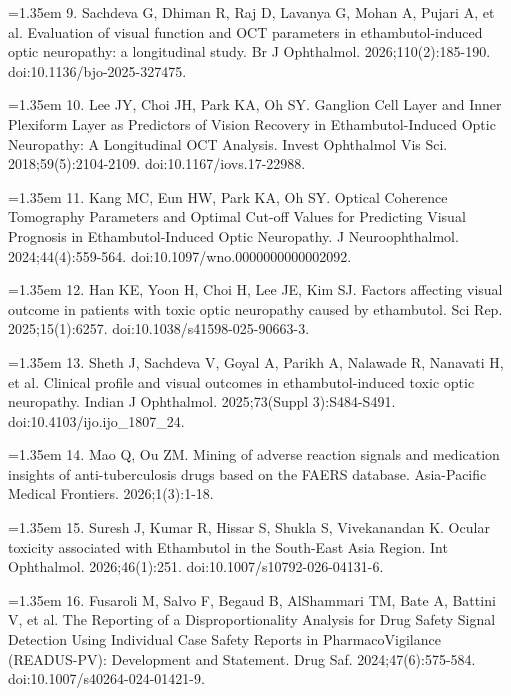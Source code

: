\documentclass[12pt,a4paper]{article}
\begin{document}
\par\noindent\hangindent=1.35em 9. Sachdeva G, Dhiman R, Raj D, Lavanya G, Mohan A, Pujari A, et al. Evaluation of visual function and OCT parameters in ethambutol-induced optic neuropathy: a longitudinal study. Br J Ophthalmol. 2026;110(2):185-190. doi:10.1136/bjo-2025-327475.\par
\par\noindent\hangindent=1.35em 10. Lee JY, Choi JH, Park KA, Oh SY. Ganglion Cell Layer and Inner Plexiform Layer as Predictors of Vision Recovery in Ethambutol-Induced Optic Neuropathy: A Longitudinal OCT Analysis. Invest Ophthalmol Vis Sci. 2018;59(5):2104-2109. doi:10.1167/iovs.17-22988.\par
\par\noindent\hangindent=1.35em 11. Kang MC, Eun HW, Park KA, Oh SY. Optical Coherence Tomography Parameters and Optimal Cut-off Values for Predicting Visual Prognosis in Ethambutol-Induced Optic Neuropathy. J Neuroophthalmol. 2024;44(4):559-564. doi:10.1097/wno.0000000000002092.\par
\par\noindent\hangindent=1.35em 12. Han KE, Yoon H, Choi H, Lee JE, Kim SJ. Factors affecting visual outcome in patients with toxic optic neuropathy caused by ethambutol. Sci Rep. 2025;15(1):6257. doi:10.1038/s41598-025-90663-3.\par
\par\noindent\hangindent=1.35em 13. Sheth J, Sachdeva V, Goyal A, Parikh A, Nalawade R, Nanavati H, et al. Clinical profile and visual outcomes in ethambutol-induced toxic optic neuropathy. Indian J Ophthalmol. 2025;73(Suppl 3):S484-S491. doi:10.4103/ijo.ijo\_1807\_24.\par
\par\noindent\hangindent=1.35em 14. Mao Q, Ou ZM. Mining of adverse reaction signals and medication insights of anti-tuberculosis drugs based on the FAERS database. Asia-Pacific Medical Frontiers. 2026;1(3):1-18.\par
\par\noindent\hangindent=1.35em 15. Suresh J, Kumar R, Hissar S, Shukla S, Vivekanandan K. Ocular toxicity associated with Ethambutol in the South-East Asia Region. Int Ophthalmol. 2026;46(1):251. doi:10.1007/s10792-026-04131-6.\par
\par\noindent\hangindent=1.35em 16. Fusaroli M, Salvo F, Begaud B, AlShammari TM, Bate A, Battini V, et al. The Reporting of a Disproportionality Analysis for Drug Safety Signal Detection Using Individual Case Safety Reports in PharmacoVigilance (READUS-PV): Development and Statement. Drug Saf. 2024;47(6):575-584. doi:10.1007/s40264-024-01421-9.\par
\end{document}

